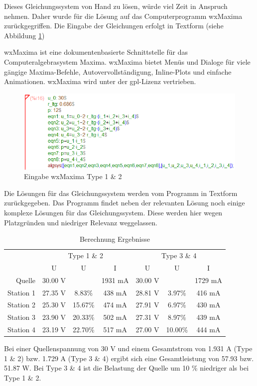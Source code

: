 Dieses Gleichungssystem von Hand zu lösen, würde viel Zeit in Anspruch nehmen.
Daher wurde für die Lösung auf das Computerprogramm wxMaxima zurückgegriffen.
Die Eingabe der Gleichungen erfolgt in Textform (siehe Abbildung \ref{fig:maxima-input})\par

wxMaxima ist eine dokumentenbasierte Schnittstelle für das Computeralgebrasystem Maxima. wxMaxima bietet Menüs und Dialoge für viele gängige Maxima-Befehle, Autovervollständigung, Inline-Plots und einfache Animationen. wxMaxima wird unter der \ac{gpl}-Lizenz vertrieben. \cite[aus dem Englischen übersetzt]{wxmaxima}\par

\begin{figure}[htbp!]
	\centering
	\includegraphics[width=.9\linewidth]{images/berechnung/max_2pair_30V.png}
	\caption{Eingabe wxMaxima Type 1 \& 2}
	\label{fig:maxima-input}
\end{figure}

Die Lösungen für das Gleichungssystem werden vom Programm in Textform zurückgegeben.
Das Programm findet neben der relevanten Lösung noch einige komplexe Lösungen für das Gleichungssystem.
Diese werden hier wegen Platzgründen und niedriger Relevanz weggelassen.
\begin{table}[H]
	\centering
	\begin{tabular}{r|ccc|ccc}
		\toprule
		&\multicolumn{3}{c|}{Type 1 \& 2}&\multicolumn{3}{c}{Type 3 \& 4}\\\cmidrule{2-7}
		&U&\tdelta U&I&U&\tdelta U&I\\
		\midrule
		Quelle&30.00 V&&1931 mA&30.00 V&&1729 mA\\
		\midrule
		Station 1&27.35 V& 8.83\%&438 mA&28.81 V& 3.97\%&416 mA\\
		Station 2&25.30 V&15.67\%&474 mA&27.91 V& 6.97\%&430 mA\\
		Station 3&23.90 V&20.33\%&502 mA&27.31 V& 8.97\%&439 mA\\
		Station 4&23.19 V&22.70\%&517 mA&27.00 V&10.00\%&444 mA\\
		\bottomrule
	\end{tabular}
	\caption{Berechnung Ergebnisse}
\end{table}
Bei einer Quellenspannung von 30 V und einem Gesamtstrom von 1.931 A (Type 1 \& 2) bzw. 1.729 A (Type 3 \& 4) ergibt sich eine Gesamtleistung von 57.93 bzw. 51.87 W.
Bei Type 3 \& 4 ist die Belastung der Quelle um 10 \% niedriger als bei Type 1 \& 2.


